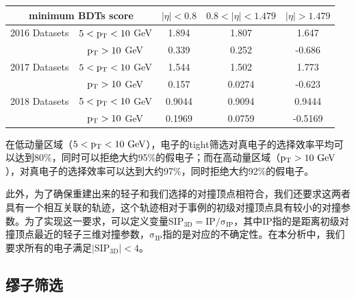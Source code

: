 \begin{table}[h!]
    \centering
    \begin{tabular}{ccc c c}
\hline

\hline %
\multicolumn{2}{c}{minimum BDTs score}    &  $|\eta| < 0.8 $ & $0.8 < |\eta| < 1.479$ 	& $|\eta| > 1.479$      \\
\hline %
2016 Datasets & $ 5 < \mathrm{p_{T}} < 10 $ GeV &  1.894      & 1.807  	& 1.647		\\
& $\mathrm{p_{T}} > 10$ GeV         &  0.339	& 0.252		&  -0.686	\\
\hline %
2017 Datasets & $ 5 < \mathrm{p_{T}} < 10 $ GeV &  1.544    & 1.502  	& 1.773		\\
& $\mathrm{p_{T}} > 10$ GeV         &  0.157    & 0.0274	& -0.623	\\
\hline %
2018 Datasets & $ 5 < \mathrm{p_{T}} < 10 $ GeV &  0.9044    & 0.9094  	& 0.9444		\\
& $\mathrm{p_{T}} > 10$ GeV         &  0.1969    & 0.0759	& -0.5169	\\
\hline %
     \end{tabular}
\small
    \label{tab:ele_ID_WP}
\end{table}

在低动量区域（$5<\pt<10\GeV$），电子的tight筛选对真电子的选择效率平均可以达到80\%，同时可以拒绝大约95\%的假电子；而在高动量区域（$\pt>10\GeV$），对真电子的选择效率可以达到大约97\%，同时拒绝大约92\%的假电子。

此外，为了确保重建出来的轻子和我们选择的对撞顶点相符合，我们还要求这两者具有一个相互关联的轨迹，这个轨迹相对于事例的初级对撞顶点具有较小的对撞参数。为了实现这一要求，可以定义变量$\mathrm{SIP_{3D} = IP/\sigma_{IP}}$，其中IP指的是距离初级对撞顶点最近的轻子三维对撞参数，$\mathrm{\sigma_{IP}}$指的是对应的不确定性。在本分析中，我们要求所有的电子满足$\mathrm{|SIP_{3D}|<4}$。

\subsection{缪子筛选}

